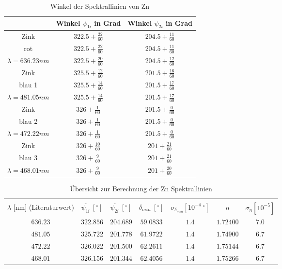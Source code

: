 \documentclass[12pt,a4paper]{article}
\begin{document}
{\begin{table}
	\centering
	\begin{tabular}{|c|c|c|}
		\hline
		& Winkel $\psi_{1i}$ in Grad & Winkel $\psi_{2i}$ in Grad\\
		\hline
		Zink&$322.5+\frac{22}{60}$&$204.5+\frac{11}{60}$\\[0.1cm]
		rot&$322.5+\frac{22}{60}$&$204.5+\frac{11}{60}$\\[0.1cm]
		$\lambda=636.23nm$&$322.5+\frac{20}{60}$&$204.5+\frac{12}{60}$\\[0.1cm]
		\hline
		Zink&$325.5+\frac{12}{60}$&$201.5+\frac{16}{60}$\\[0.1cm]
		blau 1&$325.5+\frac{14}{60}$&$201.5+\frac{17}{60}$\\[0.1cm]
		$\lambda=481.05nm$&$325.5+\frac{14}{60}$&$201.5+\frac{17}{60}$\\[0.1cm]
		\hline
		Zink&$326+\frac{1}{60}$&$201.5+\frac{0}{60}$\\[0.1cm]
		blau 2&$326+\frac{1}{60}$&$201.5+\frac{0}{60}$\\[0.1cm]
		$\lambda=472.22nm$&$326+\frac{1}{60}$&$201.5+\frac{0}{60}$\\[0.1cm]
		\hline
		Zink&$326+\frac{10}{60}$&$201+\frac{21}{60}$\\[0.1cm]
		blau 3&$326+\frac{9}{60}$&$201+\frac{21}{60}$\\[0.1cm]
		$\lambda=468.01nm$&$326+\frac{9}{60}$&$201+\frac{20}{60}$\\[0.1cm]
		\hline
	\end{tabular}
	\caption{Winkel der Spektrallinien von Zn}
	\label{table:Winkel_Rohdaten_Zn}
\end{table}

\begin{table}
	\centering
	\begin{tabular}{|c|c|c|c|c|c|c|}
		\hline
		&&&&&&\\
		$\lambda$ [nm] (Literaturwert)&$\overline{\psi_{1i}}\ [^{\circ}]$&$\overline{\psi_{2i}}\ [^{\circ}]$&$\delta_{min}\ [^{\circ}]$&$\sigma_{\delta_{min}}[10^{-4}\ ^{\circ}]$& $n$ & $\sigma_{n}[10^{-5}]$\\
		\hline
		$636.23$&$322.856$&$204.689$&$59.0833$&$1.4$&$1.72400$&$7.0$\\
		$481.05$&$325.722$&$201.778$&$61.9722$&$1.4$&$1.74900$&$6.7$\\
		$472.22$&$326.022$&$201.500$&$62.2611$&$1.4$&$1.75144$&$6.7$\\
		$468.01$&$326.156$&$201.344$&$62.4056$&$1.4$&$1.75266$&$6.7$\\
		\hline
	\end{tabular}
	\caption{Übersicht zur Berechnung der Zn Spektrallinien}
	\label{table:Zn_Rechnung}
\end{table}





}
\end{document}
